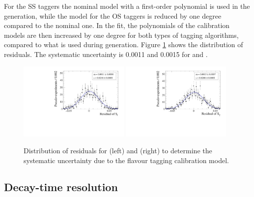 For the SS taggers the nominal model with a first-order polynomial is used in the generation, while the model for the OS taggers is reduced by one degree compared to the nominal one.
In the fit, the polynomials of the calibration models are then increased by one degree for both types of tagging algorithms, compared to what is used during generation. Figure \ref{fig:systUncertFTmodel} shows the distribution of residuals. The systematic uncertainty is \num{0.0011} and \num{0.0015} for \Sf and \Sfbar.
\begin{figure}[tbp]
    \centering
    \includegraphics[width=0.48\textwidth]{10Systematics/figs/FT_Sf_res.pdf}
    \includegraphics[width=0.48\textwidth]{10Systematics/figs/FT_Sfbar_res.pdf}
    \caption{Distribution of residuals for \Sf (left) and \Sfbar (right) to determine the systematic uncertainty due to the flavour tagging calibration model.}
    \label{fig:systUncertFTmodel}
\end{figure}

\subsection*{Decay-time resolution}

